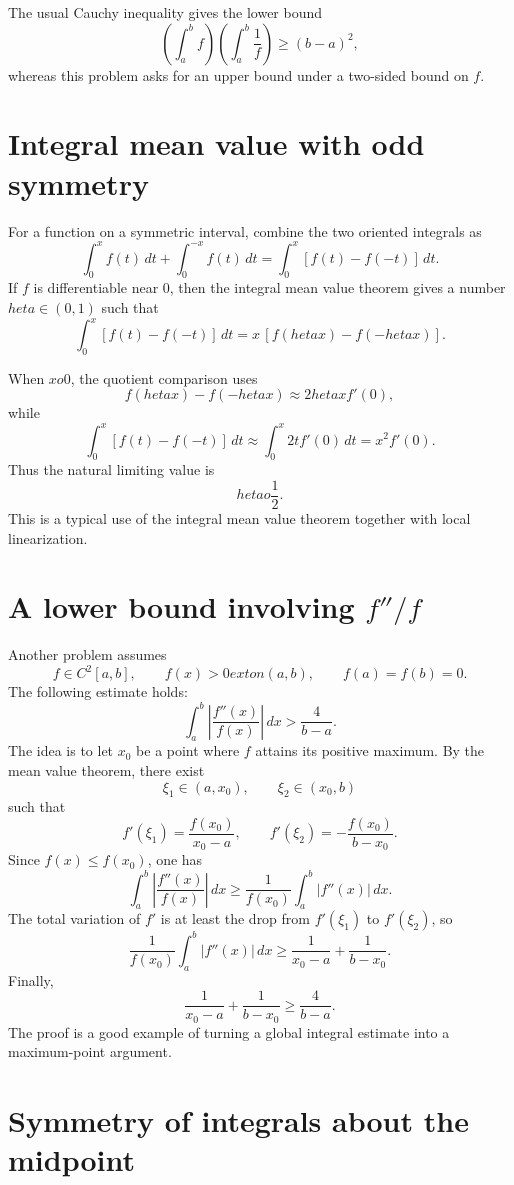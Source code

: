 The usual Cauchy inequality gives the lower bound
\[
  \left(\int_a^b f
\right)\left(\int_a^b
\frac1f
\right)\ge (b-a)^2,
\]
whereas this problem asks for an upper bound under a two-sided bound on $f$.

\section{Integral mean value with odd symmetry}

For a function on a symmetric interval, combine the two oriented integrals as
\[
  \int_0^x f(t)\,dt+\int_0^{-x}f(t)\,dt
  =
  \int_0^x [f(t)-f(-t)]\,dt.
\]
If $f$ is differentiable near $0$, then the integral mean value theorem gives a number $	heta\in(0,1)$ such that
\[
  \int_0^x [f(t)-f(-t)]\,dt
  =
  x\,[f(	heta x)-f(-	heta x)].
\]

When $x	o0$, the quotient comparison uses
\[
  f(	heta x)-f(-	heta x)\approx 2	heta x f'(0),
\]
while
\[
  \int_0^x [f(t)-f(-t)]\,dt
  \approx
  \int_0^x 2t f'(0)\,dt
  =
  x^2 f'(0).
\]
Thus the natural limiting value is
\[
  	heta	o
\frac12.
\]
This is a typical use of the integral mean value theorem together with local linearization.

\section[A lower bound involving f double-prime over f]{A lower bound involving $f''/f$}

Another problem assumes
\[
  f\in C^2[a,b],\qquad f(x)>0	ext{ on }(a,b),\qquad f(a)=f(b)=0.
\]
The following estimate holds:
\[
  \int_a^b \left|
\frac{f''(x)}{f(x)}
\right|\,dx
  >
\frac4{b-a}.
\]
The idea is to let $x_0$ be a point where $f$ attains its positive maximum.  By the mean value theorem, there exist
\[
  \xi_1\in(a,x_0),\qquad \xi_2\in(x_0,b)
\]
such that
\[
  f'(\xi_1)=
\frac{f(x_0)}{x_0-a},\qquad
  f'(\xi_2)=-
\frac{f(x_0)}{b-x_0}.
\]
Since $f(x)\le f(x_0)$, one has
\[
  \int_a^b \left|
\frac{f''(x)}{f(x)}
\right|\,dx
  \ge
\frac1{f(x_0)}\int_a^b |f''(x)|\,dx.
\]
The total variation of $f'$ is at least the drop from $f'(\xi_1)$ to $f'(\xi_2)$, so
\[
\frac1{f(x_0)}\int_a^b |f''(x)|\,dx
  \ge
\frac1{x_0-a}+
\frac1{b-x_0}.
\]
Finally,
\[
\frac1{x_0-a}+
\frac1{b-x_0}
  \ge
\frac4{b-a}.
\]
The proof is a good example of turning a global integral estimate into a maximum-point argument.

\section{Symmetry of integrals about the midpoint}

